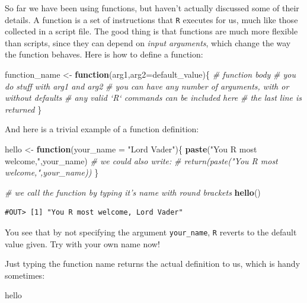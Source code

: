 \documentclass[]{book}
\newenvironment{Shaded}{\begin{snugshade}}{\end{snugshade}}
\newcommand{\KeywordTok}[1]{\textcolor[rgb]{0.13,0.29,0.53}{\textbf{#1}}}
\newcommand{\DataTypeTok}[1]{\textcolor[rgb]{0.13,0.29,0.53}{#1}}
\newcommand{\StringTok}[1]{\textcolor[rgb]{0.31,0.60,0.02}{#1}}
\newcommand{\CommentTok}[1]{\textcolor[rgb]{0.56,0.35,0.01}{\textit{#1}}}
\newcommand{\ControlFlowTok}[1]{\textcolor[rgb]{0.13,0.29,0.53}{\textbf{#1}}}
\newcommand{\NormalTok}[1]{#1}
\theoremstyle{definition}
\theoremstyle{definition}
\theoremstyle{definition}
\theoremstyle{remark}
\begin{document}
So far we have been using functions, but haven't actually discussed some
of their details. A function is a set of instructions that \texttt{R}
executes for us, much like those collected in a script file. The good
thing is that functions are much more flexible than scripts, since they
can depend on \emph{input arguments}, which change the way the function
behaves. Here is how to define a function:

\begin{Shaded}
\begin{Highlighting}[]
\NormalTok{function_name <-}\StringTok{ }\ControlFlowTok{function}\NormalTok{(arg1,}\DataTypeTok{arg2=}\NormalTok{default_value)\{}
  \CommentTok{# function body}
  \CommentTok{# you do stuff with arg1 and arg2}
  \CommentTok{# you can have any number of arguments, with or without defaults}
  \CommentTok{# any valid `R` commands can be included here}
  \CommentTok{# the last line is returned}
\NormalTok{\}}
\end{Highlighting}
\end{Shaded}

And here is a trivial example of a function definition:

\begin{Shaded}
\begin{Highlighting}[]
\NormalTok{hello <-}\StringTok{ }\ControlFlowTok{function}\NormalTok{(}\DataTypeTok{your_name =} \StringTok{"Lord Vader"}\NormalTok{)\{}
  \KeywordTok{paste}\NormalTok{(}\StringTok{"You R most welcome,"}\NormalTok{,your_name)}
  \CommentTok{# we could also write:}
  \CommentTok{# return(paste("You R most welcome,",your_name))}
\NormalTok{\}}

\CommentTok{# we call the function by typing it's name with round brackets}
\KeywordTok{hello}\NormalTok{()}
\end{Highlighting}
\end{Shaded}

\begin{verbatim}
#OUT> [1] "You R most welcome, Lord Vader"
\end{verbatim}

You see that by not specifying the argument \texttt{your\_name},
\texttt{R} reverts to the default value given. Try with your own name
now!

Just typing the function name returns the actual definition to us, which
is handy sometimes:

\begin{Shaded}
\begin{Highlighting}[]
\NormalTok{hello}
\end{Highlighting}
\end{Shaded}
\end{document}

